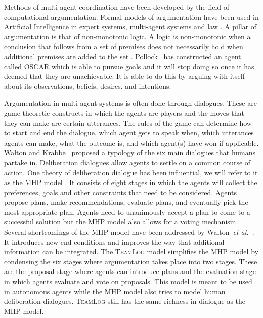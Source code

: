 Methods of multi-agent coordination have been developed by the field of
computational argumentation. Formal models of argumentation have been used in
Artificial Intelligence in expert systems, multi-agent systems and law
\cite{vaneemeren2014}. A pillar of argumentation is that of non-monotonic 
logic. A logic is non-monotonic when a conclusion that follows from a set of 
premises does not necessarily hold when additional premises are 
added to the set \cite{modgil2013,vaneemeren2014}. 
Pollock~ has constructed an agent called OSCAR which is 
able to pursue goals and it will stop doing so once it has deemed that they are 
unachievable. It is able to do this by arguing with itself about its 
observations, beliefs, desires, and intentions.

Argumentation in multi-agent systems is often done through dialogues. These are 
game theoretic constructs in which the agents are players and the moves that 
they can make are 
certain utterances. The rules of the game can determine how to start 
and end the dialogue, which agent gets to speak when, which utterances agents 
can make, what the outcome is, and which agent(s) have won if applicable. 
Walton and Krabbe~ proposed a typology of the six main 
dialogues 
that humans partake in. Deliberation dialogues allow agents to settle on a 
common course of action. One theory of deliberation dialogue has been 
influential, we will refer to it as the MHP model \cite{mcburney2007}. It 
consists of eight stages in which the agents will collect the preferences, 
goals and other constraints that need to be considered. Agents propose plans, 
make recommendations, evaluate plans, and eventually pick the most appropriate 
plan. Agents need to unanimously accept a plan to come to a successful 
solution but the MHP model also allows for a voting mechanism. Several 
shortcomings of the MHP model have been addressed by 
Walton~\emph{et al.}~. It 
introduces new end-conditions and improves the way that additional information 
can be integrated. The \textsc{TeamLog} model \cite{dunin-keplicz2011} 
simplifies the MHP model by condensing the six stages where argumentation takes 
place into two stages. These are the proposal stage where agents can introduce 
plans and the evaluation stage in which agents evaluate and vote on proposals. 
This model is meant to be used in autonomous agents while the MHP model also 
tries to model human deliberation dialogues.
\textsc{TeamLog} still has the same richness in dialogue as the MHP model.

